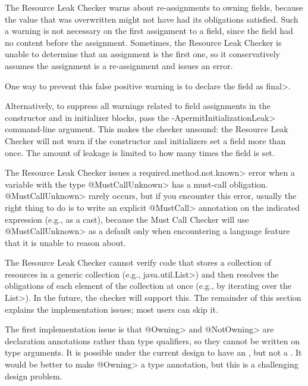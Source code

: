 

The Resource Leak Checker warns about re-assignments to owning fields,
because the value that was overwritten might not have had its obligations
satisfied.  Such a warning is not necessary on the first assignment to a
field, since the field had no content before the assignment.  Sometimes,
the Resource Leak Checker is unable to determine that an assignment is the
first one, so it conservatively assumes the assignment is a re-assignment
and issues an error.

One way to prevent this false positive warning is to declare the field as \<final>.

Alternatively, to suppress all warnings related to field assignments in the
constructor and in initializer blocks, pass the
\<-ApermitInitializationLeak> command-line argument.  This makes the
checker unsound:  the Resource Leak Checker will not warn if the constructor
and initializers set a field more than once.  The amount of leakage is
limited to how many times the field is set.


The Resource Leak Checker issues a \<required.method.not.known> error
when a variable with the type \<@MustCallUnknown> has a must-call obligation.
\<@MustCallUnknown> rarely occurs, but if you encounter this error, usually
the right thing to do is to write an explicit \<@MustCall> annotation
on the indicated expression (e.g., as a cast), because the Must Call Checker
will use \<@MustCallUnknown> as a default only when encountering a language
feature that it is unable to reason about.


The Resource Leak Checker cannot verify code that stores a collection of
resources in a generic collection (e.g., \<java.util.List>) and then
resolves the obligations of each element of the collection at once (e.g.,
by iterating over the \<List>).  In the future, the checker will support
this.  The remainder of this section explains the implementation issues;
most users can skip it.

The first implementation issue is that \<@Owning> and \<@NotOwning> are
declaration annotations rather than type qualifiers, so they cannot be
written on type arguments. It is possible under the current design to have
an , but not a .
It would be better to make \<@Owning> a type annotation, but this is a
challenging design problem.

